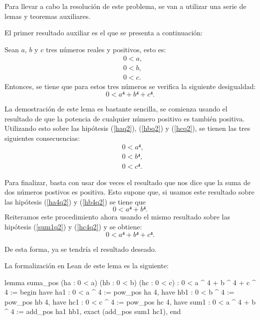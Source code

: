 Para llevar a cabo la resolución de este problema, se van a utilizar
una serie de lemas y teoremas auxiliares.

El primer resultado auxiliar es el que se presenta a continuación:

\begin{lema}\label{lemasuma}
  Sean \(a\), \(b\) y \(c\) tres números reales y positivos, esto es:
  \begin{align}
    &0 < a, \label{haq2}\tag{ha}\\
    &0 < b, \label{hbq2}\tag{hb}\\
    &0 < c. \label{hcq2}\tag{hc}
  \end{align}
  Entonces, se tiene que para estos tres números se verifica la siguiente
  desigualdad:
  \begin{equation}
    0 < a⁴+b⁴+c⁴.
  \end{equation}
\end{lema}

\begin{demostracion}
  La demostración de este lema es bastante sencilla, se comienza usando
  el resultado de que la potencia de cualquier número positivo es
  también positiva. Utilizando esto sobre las hipótesis (\ref{haq2}),
  (\ref{hbq2}) y (\ref{hcq2}), se tienen las tres siguientes
  consecuencias:
  \begin{align}
    &0 < a⁴, \label{ha4q2}\tag{ha1}\\
    &0 < b⁴, \label{hb4q2}\tag{hb1}\\
    &0 < c⁴. \label{hc4q2}\tag{hc1}
  \end{align}

  Para finalizar, basta con usar dos veces el resultado que nos dice que
  la suma de dos números postivos es positiva. Esto supone que, si
  usamos este resultado sobre las hipótesis (\ref{ha4q2}) y
  (\ref{hb4q2}) se tiene que
  \begin{equation}\label{sum1q2}\tag{sum1}
    0 < a⁴+b⁴.
  \end{equation}
  Reiteramos este procedimiento ahora usando el mismo resultado sobre
  las hipótesis (\ref{sum1q2}) y (\ref{hc4q2}) y se obtiene:
  \begin{equation}
    0 < a⁴+b⁴+c⁴.
  \end{equation}

  De esta forma, ya se tendría el resultado deseado.
\end{demostracion}

La formalización en Lean de este lema es la siguiente:
\begin{leancode}
lemma suma_pos
  (ha : 0 < a)
  (hb : 0 < b)
  (hc : 0 < c)
  : 0 < a ^ 4 + b ^ 4 + c ^ 4 :=
begin
  have ha1 : 0 < a ^ 4          := pow_pos ha 4,
  have hb1 : 0 < b ^ 4          := pow_pos hb 4,
  have hc1 : 0 < c ^ 4          := pow_pos hc 4,
  have sum1 : 0 < a ^ 4 + b ^ 4 := add_pos ha1 hb1,
  exact (add_pos sum1 hc1),
end
\end{leancode}

